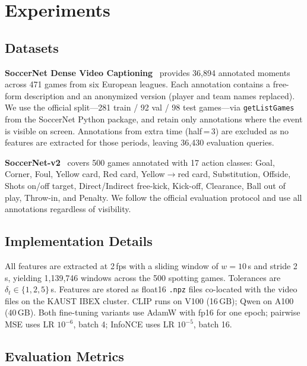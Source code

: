 \documentclass[10pt,twocolumn]{article}
\begin{document}
\section{Experiments}

\subsection{Datasets}

\noindent\textbf{SoccerNet Dense Video Captioning}~\cite{zhou2024soccernet} provides 36,894 annotated moments across 471 games from six European leagues. Each annotation contains a free-form description and an anonymized version (player and team names replaced). We use the official split---281 train / 92 val / 98 test games---via \texttt{getListGames} from the SoccerNet Python package, and retain only annotations where the event is visible on screen. Annotations from extra time (half\,=\,3) are excluded as no features are extracted for those periods, leaving 36,430 evaluation queries.

\noindent\textbf{SoccerNet-v2}~\cite{deliege2021soccernetv2} covers 500 games annotated with 17 action classes: Goal, Corner, Foul, Yellow card, Red card, Yellow$\to$red card, Substitution, Offside, Shots on/off target, Direct/Indirect free-kick, Kick-off, Clearance, Ball out of play, Throw-in, and Penalty. We follow the official evaluation protocol and use all annotations regardless of visibility.

\subsection{Implementation Details}

All features are extracted at 2\,fps with a sliding window of $w = 10$\,s and stride 2\,s, yielding 1,139,746 windows across the 500 spotting games. Tolerances are $\delta_t \in \{1, 2, 5\}$\,s. Features are stored as float16 \texttt{.npz} files co-located with the video files on the KAUST IBEX cluster. CLIP runs on V100 (16\,GB); Qwen on A100 (40\,GB). Both fine-tuning variants use AdamW with fp16 for one epoch; pairwise MSE uses LR $10^{-6}$, batch 4; InfoNCE uses LR $10^{-5}$, batch 16.

\subsection{Evaluation Metrics}
\end{document}
